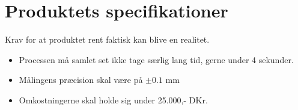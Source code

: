\section{Produktets specifikationer}

Krav for at produktet rent faktisk kan blive en realitet.

\begin{itemize}
    \item Processen må samlet set ikke tage særlig lang tid, gerne under 4 sekunder.
    \item Målingens præcision skal være på $\pm 0.1$ mm
    \item Omkostningerne skal holde sig under 25.000,- DKr.
\end{itemize}